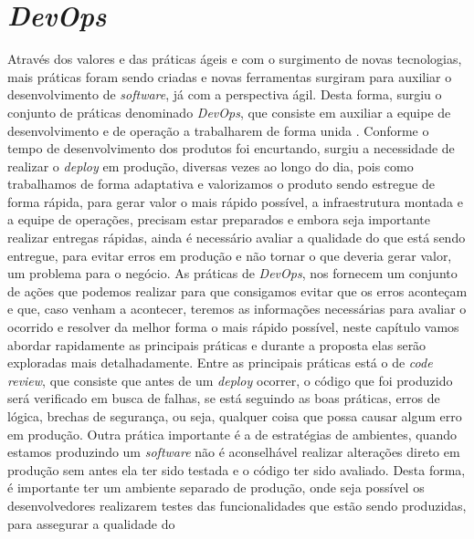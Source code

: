     \section{\textit{DevOps}}
      Através dos valores e das práticas ágeis e com o surgimento de novas
      tecnologias, mais práticas foram sendo criadas e novas ferramentas surgiram
      para auxiliar o desenvolvimento de \textit{software}, já com a perspectiva
      ágil. Desta forma, surgiu o conjunto de práticas denominado \textit{DevOps},
      que consiste em auxiliar a equipe de desenvolvimento e de operação a trabalharem
      de forma unida \cite{TheDevOpsHandbook}. Conforme o tempo de desenvolvimento
      dos produtos foi encurtando, surgiu a necessidade de realizar o \textit{deploy}
      em produção, diversas vezes ao longo do dia, pois como trabalhamos de forma
      adaptativa e valorizamos o produto sendo estregue de forma rápida, para gerar
      valor o mais rápido possível, a infraestrutura montada e a equipe de operações,
      precisam estar preparados e embora seja importante realizar entregas rápidas,
      ainda é necessário avaliar a qualidade do que está sendo entregue, para
      evitar erros em produção e não tornar o que deveria gerar valor, um problema
      para o negócio. \newline
      As práticas de \textit{DevOps}, nos fornecem um conjunto de ações que podemos
      realizar para que consigamos evitar que os erros aconteçam e que, caso venham
      a acontecer, teremos as informações necessárias para avaliar o ocorrido e
      resolver da melhor forma o mais rápido possível, neste capítulo vamos abordar
      rapidamente as principais práticas e durante a proposta elas serão exploradas
      mais detalhadamente. \newline
      Entre as principais práticas está o de \textit{code review}, que consiste
      que antes de um \textit{deploy} ocorrer, o código que foi produzido será
      verificado em busca de falhas, se está seguindo as boas práticas, erros de
      lógica, brechas de segurança, ou seja, qualquer coisa que possa causar algum
      erro em produção. Outra prática importante é a de estratégias de ambientes,
      quando estamos produzindo um \textit{software} não é aconselhável realizar
      alterações direto em produção sem antes ela ter sido testada e o código
      ter sido avaliado. Desta forma, é importante ter um ambiente separado de
      produção, onde seja possível os desenvolvedores realizarem testes das
      funcionalidades que estão sendo produzidas, para assegurar a qualidade do
